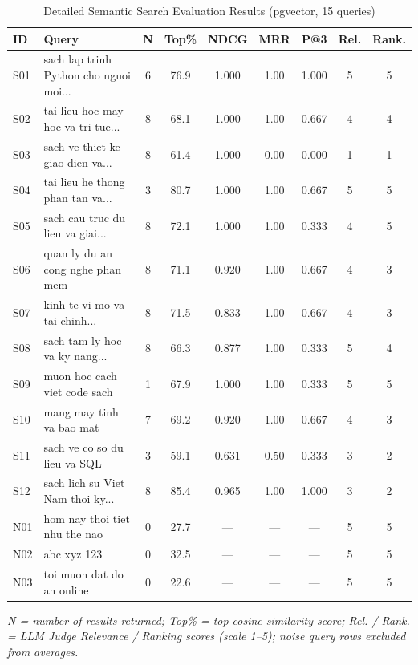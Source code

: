 \begin{table}[H]
\centering
\caption{Detailed Semantic Search Evaluation Results (pgvector, 15 queries)}
\label{tab:search_eval_results}
\begin{tabularx}{\textwidth}{|l|X|c|c|c|c|c|c|c|}
\hline
\textbf{ID} & \textbf{Query} & \textbf{N} & \textbf{Top\%} & \textbf{NDCG} & \textbf{MRR} & \textbf{P@3} & \textbf{Rel.} & \textbf{Rank.} \\
\hline
S01 & sach lap trinh Python cho nguoi moi... & 6 & 76.9 & 1.000 & 1.00 & 1.000 & 5 & 5 \\
\hline
S02 & tai lieu hoc may hoc va tri tue... & 8 & 68.1 & 1.000 & 1.00 & 0.667 & 4 & 4 \\
\hline
S03 & sach ve thiet ke giao dien va... & 8 & 61.4 & 1.000 & 0.00 & 0.000 & 1 & 1 \\
\hline
S04 & tai lieu he thong phan tan va... & 3 & 80.7 & 1.000 & 1.00 & 0.667 & 5 & 5 \\
\hline
S05 & sach cau truc du lieu va giai... & 8 & 72.1 & 1.000 & 1.00 & 0.333 & 4 & 5 \\
\hline
S06 & quan ly du an cong nghe phan mem & 8 & 71.1 & 0.920 & 1.00 & 0.667 & 4 & 3 \\
\hline
S07 & kinh te vi mo va tai chinh... & 8 & 71.5 & 0.833 & 1.00 & 0.667 & 4 & 3 \\
\hline
S08 & sach tam ly hoc va ky nang... & 8 & 66.3 & 0.877 & 1.00 & 0.333 & 5 & 4 \\
\hline
S09 & muon hoc cach viet code sach & 1 & 67.9 & 1.000 & 1.00 & 0.333 & 5 & 5 \\
\hline
S10 & mang may tinh va bao mat & 7 & 69.2 & 0.920 & 1.00 & 0.667 & 4 & 3 \\
\hline
S11 & sach ve co so du lieu va SQL & 3 & 59.1 & 0.631 & 0.50 & 0.333 & 3 & 2 \\
\hline
S12 & sach lich su Viet Nam thoi ky... & 8 & 85.4 & 0.965 & 1.00 & 1.000 & 3 & 2 \\
\hline
N01 & hom nay thoi tiet nhu the nao & 0 & 27.7 & --- & --- & --- & 5 & 5 \\
\hline
N02 & abc xyz 123 & 0 & 32.5 & --- & --- & --- & 5 & 5 \\
\hline
N03 & toi muon dat do an online & 0 & 22.6 & --- & --- & --- & 5 & 5 \\
\hline
\end{tabularx}
\end{table}

\noindent \textit{N = number of results returned; Top\% = top cosine similarity score; Rel. / Rank. = LLM Judge Relevance / Ranking scores (scale 1--5); noise query rows excluded from averages.}

